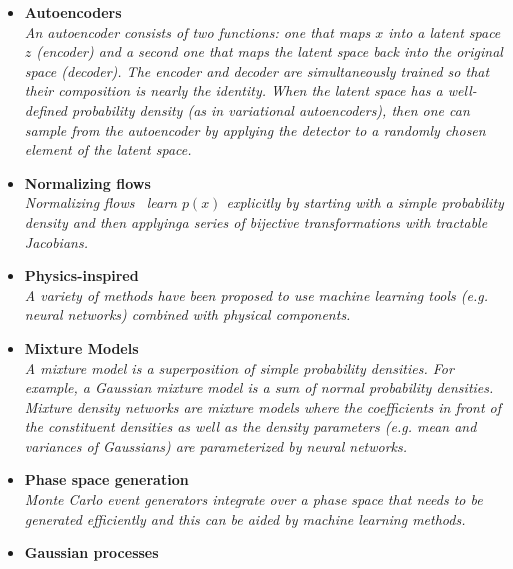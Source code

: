 \documentclass[12pt,letterpaper]{article}
\begin{document}
\begin{itemize}
\begin{itemize}
		\item \textbf{Autoencoders}~\cite{Monk:2018zsb,ATL-SOFT-PUB-2018-001,Cheng:2020dal,1816035,Howard:2021pos,Buhmann:2021lxj,Bortolato:2021zic,deja2020endtoend,Hariri:2021clz,Fanelli:2019qaq}
		\\\textit{An autoencoder consists of two functions: one that maps $x$ into a latent space $z$ (encoder) and a second one that maps the latent space back into the original space (decoder).  The encoder and decoder are simultaneously trained so that their composition is nearly the identity.  When the latent space has a well-defined probability density (as in variational autoencoders), then one can sample from the autoencoder by applying the detector to a randomly chosen element of the latent space.}
\item \textbf{Normalizing flows}~\cite{Albergo:2019eim,Kanwar:2003.06413,Brehmer:2020vwc,Bothmann:2020ywa,Gao:2020zvv,Gao:2020vdv,Nachman:2020lpy,Choi:2020bnf,Lu:2020npg,Bieringer:2020tnw,Hollingsworth:2021sii}
		\\\textit{Normalizing flows~\cite{pmlr-v37-rezende15} learn $p(x)$ explicitly by starting with a simple probability density and then applyinga series of bijective transformations with tractable Jacobians.}
		\item \textbf{Physics-inspired}~\cite{Andreassen:2018apy,Andreassen:2019txo,1808876,Lai:2020byl,Barenboim:2021vzh}
		\\\textit{A variety of methods have been proposed to use machine learning tools (e.g. neural networks) combined with physical components.}
		\item \textbf{Mixture Models}~\cite{Chen:2020uds,Burton:2021tsd}
		\\\textit{A mixture model is a superposition of simple probability densities.  For example, a Gaussian mixture model is a sum of normal probability densities.  Mixture density networks are mixture models where the coefficients in front of the constituent densities as well as the density parameters (e.g. mean and variances of Gaussians) are parameterized by neural networks.}
		\item \textbf{Phase space generation}~\cite{Bendavid:2017zhk,Bothmann:2020ywa,Gao:2020zvv,Gao:2020vdv,Klimek:2018mza,Carrazza:2020rdn,Nachman:2020fff,Chen:2020nfb,Verheyen:2020bjw,Backes:2020vka}
		\\\textit{Monte Carlo event generators integrate over a phase space that needs to be generated efficiently and this can be aided by machine learning methods.}
		\item \textbf{Gaussian processes}~\cite{Frate:2017mai,Bertone:2016mdy,1804325,Cisbani:2019xta}

\end{itemize}
\end{itemize}
\end{document}
